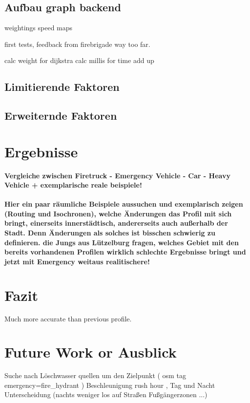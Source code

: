 \documentclass[10pt,a4paper]{report}
\begin{document}
\subsection{Aufbau graph backend}

weightings 
speed maps

first tests, feedback from firebrigade
way too far.

calc weight for dijkstra
calc millis for time add up



\subsection{Limitierende Faktoren}

\subsection{Erweiternde Faktoren}

\section{Ergebnisse}
\paragraph{
Vergleiche zwischen Firetruck - Emergency Vehicle - Car - Heavy Vehicle
+ exemplarische reale beispiele!
}
\paragraph{
\color{red}
Hier ein paar räumliche Beispiele aussuchen und exemplarisch zeigen (Routing und Isochronen), welche Änderungen das Profil mit sich bringt, einerseits innerstädtisch, andererseits auch außerhalb der Stadt. Denn Änderungen als solches ist bisschen schwierig zu definieren. die Jungs aus Lützelburg fragen, welches Gebiet mit den bereits vorhandenen Profilen wirklich schlechte Ergebnisse bringt und jetzt mit Emergency weitaus realitischere!
}

\section{Fazit}

Much more accurate than previous profile. 

\section{Future Work or Ausblick}

Suche nach Löschwasser quellen um den Zielpunkt ( osm tag emergency=fire\_hydrant )
Beschleunigung
rush hour , Tag und Nacht Unterscheidung (nachts weniger los auf Straßen\/ Fußgängerzonen ...)
\end{document}
